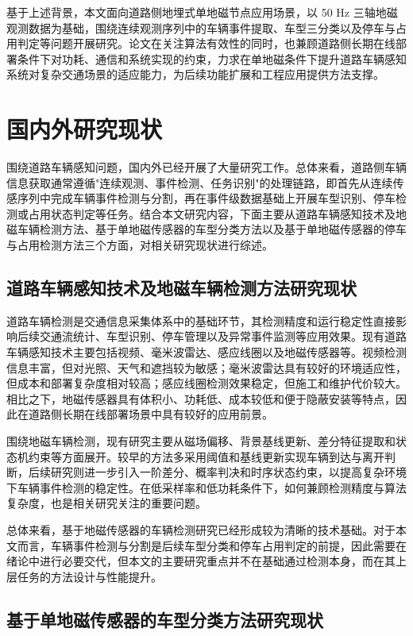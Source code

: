 基于上述背景，本文面向道路侧地埋式单地磁节点应用场景，以 50 Hz 三轴地磁观测数据为基础，围绕连续观测序列中的车辆事件提取、车型三分类以及停车与占用判定等问题开展研究。论文在关注算法有效性的同时，也兼顾道路侧长期在线部署条件下对功耗、通信和系统实现的约束，力求在单地磁条件下提升道路车辆感知系统对复杂交通场景的适应能力，为后续功能扩展和工程应用提供方法支撑。


\section{国内外研究现状}
\label{sec:related_work}

围绕道路车辆感知问题，国内外已经开展了大量研究工作。总体来看，道路侧车辆信息获取通常遵循"连续观测、事件检测、任务识别"的处理链路，即首先从连续传感序列中完成车辆事件检测与分割，再在事件级数据基础上开展车型识别、停车检测或占用状态判定等任务。结合本文研究内容，下面主要从道路车辆感知技术及地磁车辆检测方法、基于单地磁传感器的车型分类方法以及基于单地磁传感器的停车与占用检测方法三个方面，对相关研究现状进行综述。

\subsection{道路车辆感知技术及地磁车辆检测方法研究现状}
\label{sec:related_sensor_detection}

道路车辆检测是交通信息采集体系中的基础环节，其检测精度和运行稳定性直接影响后续交通流统计、车型识别、停车管理以及异常事件监测等应用效果。现有道路车辆感知技术主要包括视频、毫米波雷达、感应线圈以及地磁传感器等。视频检测信息丰富，但对光照、天气和遮挡较为敏感；毫米波雷达具有较好的环境适应性，但成本和部署复杂度相对较高；感应线圈检测效果稳定，但施工和维护代价较大。相比之下，地磁传感器具有体积小、功耗低、成本较低和便于隐蔽安装等特点，因此在道路侧长期在线部署场景中具有较好的应用前景。

围绕地磁车辆检测，现有研究主要从磁场偏移、背景基线更新、差分特征提取和状态机约束等方面展开。较早的方法多采用阈值和基线更新实现车辆到达与离开判断，后续研究则进一步引入一阶差分、概率判决和时序状态约束，以提高复杂环境下车辆事件检测的稳定性。在低采样率和低功耗条件下，如何兼顾检测精度与算法复杂度，也是相关研究关注的重要问题。

总体来看，基于地磁传感器的车辆检测研究已经形成较为清晰的技术基础。对于本文而言，车辆事件检测与分割是后续车型分类和停车占用判定的前提，因此需要在绪论中进行必要交代，但本文的主要研究重点并不在基础通过检测本身，而在其上层任务的方法设计与性能提升。

\subsection{基于单地磁传感器的车型分类方法研究现状}
\label{sec:related_vehicle_classification}

